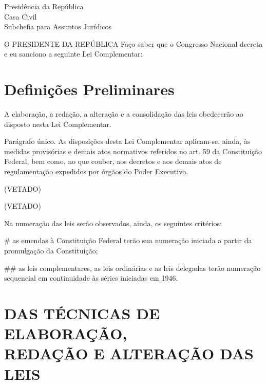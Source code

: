 \documentclass[a5paper,capitulo,titlepage=false]{br-lex}
\begin{document}
\begin{center}
		Presidência da República\\
	Casa Civil\\
	Subchefia para Assuntos Jurídicos	
\end{center}




O PRESIDENTE DA REPÚBLICA Faço  saber  que   o    Congresso  Nacional decreta e eu sanciono  a  seguinte Lei Complementar:
	
\chapter{Definições Preliminares}
\label{chap:disposicoes}


\artigo A elaboração, a redação, a alteração e a consolidação das leis obedecerão ao disposto nesta Lei Complementar.

Parágrafo único. As disposições desta Lei Complementar aplicam-se, ainda, às medidas provisórias e demais atos normativos referidos no art. 59 da Constituição Federal, bem como, no que couber, aos decretos e aos demais atos de regulamentação expedidos por órgãos do Poder Executivo.

\artigo (VETADO)

\begin{paragrafos}
\paragrafo (VETADO)

\paragrafo Na numeração das leis serão observados, ainda, os seguintes critérios:
\end{paragrafos}


\begin{easylist}

#  as emendas à Constituição Federal terão sua numeração iniciada a partir da promulgação da Constituição;

##  as leis complementares, as leis ordinárias e as leis delegadas terão numeração sequencial em continuidade às séries iniciadas em 1946.

\end{easylist}


\chapter[Das técnicas de elaboração, redação e alteração das leis]{DAS TÉCNICAS DE ELABORAÇÃO,\\ REDAÇÃO E ALTERAÇÃO DAS LEIS}
\label{chap:tecnicas}
\end{document}
